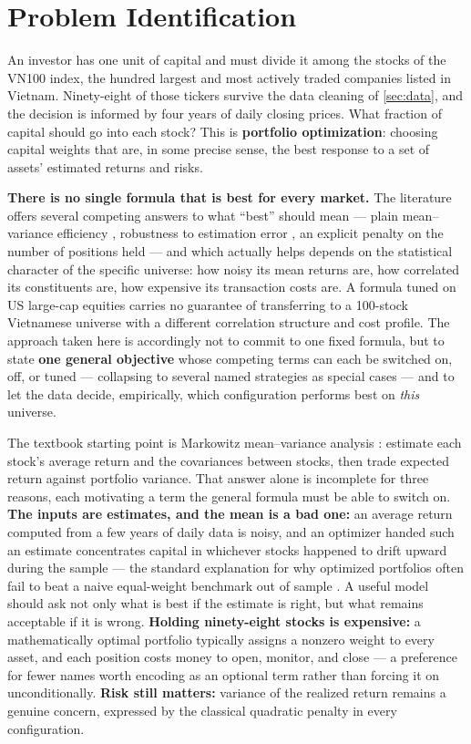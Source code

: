 \section{Problem Identification}\label{sec:identification}

An investor has one unit of capital and must divide it among the stocks of the VN100 index, the
hundred largest and most actively traded companies listed in Vietnam. Ninety-eight of those
tickers survive the data cleaning of \cref{sec:data}, and the decision is informed by four
years of daily closing prices. What fraction of capital should go into each stock? This is
\textbf{portfolio optimization}: choosing capital weights that are, in some precise sense, the
best response to a set of assets' estimated returns and risks.

\textbf{There is no single formula that is best for every market.} The literature offers several
competing answers to what ``best'' should mean --- plain mean--variance efficiency
\citep{markowitz1952}, robustness to estimation error \citep{goldfarb2003}, an explicit penalty
on the number of positions held \citep{tibshirani1996, brodie2009} --- and which actually helps
depends on the statistical character of the specific universe: how noisy its mean returns are,
how correlated its constituents are, how expensive its transaction costs are. A formula tuned on
US large-cap equities carries no guarantee of transferring to a 100-stock Vietnamese universe with
a different correlation structure and cost profile. The approach taken here is accordingly not to
commit to one fixed formula, but to state \textbf{one general objective} whose competing terms can
each be switched on, off, or tuned --- collapsing to several named strategies as special cases ---
and to let the data decide, empirically, which configuration performs best on \emph{this}
universe.

The textbook starting point is Markowitz mean--variance analysis \citep{markowitz1952}: estimate
each stock's average return and the covariances between stocks, then trade expected return
against portfolio variance. That answer alone is incomplete for three reasons, each motivating a
term the general formula must be able to switch on. \textbf{The inputs are estimates, and the mean
is a bad one:} an average return computed from a few years of daily data is noisy, and an
optimizer handed such an estimate concentrates capital in whichever stocks happened to drift
upward during the sample --- the standard explanation for why optimized portfolios often fail to
beat a naive equal-weight benchmark out of sample \citep{demiguel2009}. A useful model should ask
not only what is best if the estimate is right, but what remains acceptable if it is wrong.
\textbf{Holding ninety-eight stocks is expensive:} a mathematically optimal portfolio typically
assigns a nonzero weight to every asset, and each position costs money to open, monitor, and close
--- a preference for fewer names worth encoding as an optional term rather than forcing it on
unconditionally. \textbf{Risk still matters:} variance of the realized return remains a genuine
concern, expressed by the classical quadratic penalty in every configuration.

